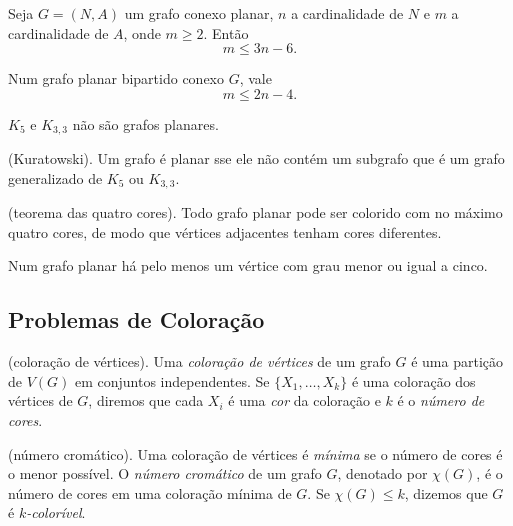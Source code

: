 \documentclass{article}
\begin{document}
\begin{cor}
    Seja \(G = (N, A)\) um grafo conexo planar, \(n\) a cardinalidade de \(N\) e \(m\) a cardinalidade de \(A\), onde \(m \geq 2\). Então
    \begin{equation}
        m \leq 3n - 6.
    \end{equation}
\end{cor}

\begin{cor}
    Num grafo planar bipartido conexo \(G\), vale 
    \begin{equation}
        m \leq 2n - 4.
    \end{equation}
\end{cor}

\begin{cor}
    \(K_5\) e \(K_{3,3}\) não são grafos planares.
\end{cor}

\begin{thm} (Kuratowski).
    Um grafo é planar sse ele não contém um subgrafo que é um grafo generalizado de \(K_5\) ou \(K_{3,3}\).
\end{thm}

\begin{thm} (teorema das quatro cores).
    Todo grafo planar pode ser colorido com no máximo quatro cores, de modo que vértices adjacentes tenham cores diferentes.
\end{thm}

\begin{lem}
    Num grafo planar há pelo menos um vértice com grau menor ou igual a cinco.
\end{lem}

\subsection{Problemas de Coloração}

\begin{defn} (coloração de vértices).
    Uma \emph{coloração de vértices} de um grafo \(G\) é uma partição de \(V(G)\) em conjuntos independentes. Se \(\{X_1, \ldots, X_k\}\) é uma coloração dos vértices de \(G\), diremos que cada \(X_i\) é uma \emph{cor} da coloração e \(k\) é o \emph{número de cores}.
\end{defn}

\begin{defn} (número cromático).
    Uma coloração de vértices é \emph{mínima} se o número de cores é o menor possível. O \emph{número cromático} de um grafo \(G\), denotado por \(\chi(G)\), é o número de cores em uma coloração mínima de \(G\).
    Se \(\chi(G) \leq k\), dizemos que \(G\) é \emph{\(k\)-colorível}.
\end{defn}
\end{document}
